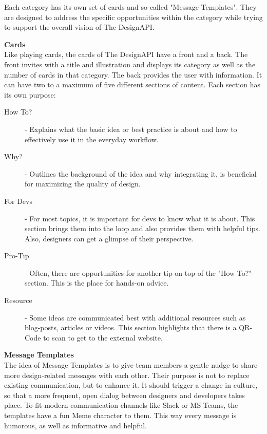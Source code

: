 Each category has its own set of cards and so-called "Message Templates". They are designed to
address the specific opportunities within the category while trying to support the overall vision of
The DesignAPI.

\textbf{Cards}\\
Like playing cards, the cards of The DesignAPI have a front and a back. The front invites with a
title and illustration and displays its category as well as the number of cards in that category.
The back provides the user with information. It can have two to a maximum of five different sections
of content. Each section has its own purpose:

\begin{description}
      \item[How To?] - Explains what the basic idea or best practice is about and how to
            effectively use it in the everyday workflow.

      \item[Why?] - Outlines the background of the idea and why integrating it, is beneficial for
            maximizing the quality of design.

      \item[For Devs] - For most topics, it is important for devs to know what it is about. This
            section brings them into the loop and also provides them with helpful tips. Also,
            designers can get a glimpse of their perspective.

      \item[Pro-Tip] - Often, there are opportunities for another tip on top of the "How To?"-section.
            This is the place for hands-on advice.

      \item[Resource] - Some ideas are communicated best with additional resources such as blog-posts,
            articles or videos. This section highlights that there is a QR-Code to scan to get to the
            external website.
\end{description}

\textbf{Message Templates}\\
The idea of Message Templates is to give team members a gentle nudge to share more design-related
messages with each other. Their purpose is not to replace existing communication, but to enhance it.
It should trigger a change in culture, so that a more frequent, open dialog between designers and
developers takes place.
To fit modern communication channels like Slack or MS Teams, the templates have a fun Meme character
to them. This way every message is humorous, as well as informative and helpful.


